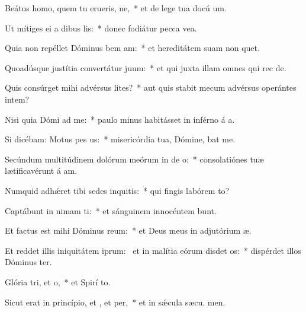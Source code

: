 \item Beátus homo, quem tu erueris, ne,~* et de lege tua docú um.
\item Ut mítiges ei a dibus lis:~* donec fodiátur pecca vea.
\item Quia non repéllet Dóminus bem am:~* et hereditátem suam non quet.
\item Quoadúsque justítia convertátur  juum:~* et qui juxta illam omnes qui rec  de.
\item Quis consúrget mihi advérsus lites?~* aut quis stabit mecum advérsus operántes intem?
\item Nisi quia Dómi ad me:~* paulo minus habitásset in inférno á a.
\item Si dicébam: Motus  pes us:~* misericórdia tua, Dómine, bat me.
\item Secúndum multitúdinem dolórum meórum in de o:~* consolatiónes tuæ lætificavérunt á am.
\item Numquid adhǽret tibi sedes inquitis:~* qui fingis labórem  to?
\item Captábunt in nimam ti:~* et sánguinem innocéntem bunt.
\item Et factus est mihi Dóminus  reum:~* et Deus meus in adjutórium  æ.
\item Et reddet illis iniquitátem iprum:~\pscross{} et in malítia eórum disdet os:~* dispérdet illos Dóminus  ter.
\item Glória tri, et o,~* et Spirí to.
\item Sicut erat in princípio, et , et per,~* et in sǽcula sæcu. men.
